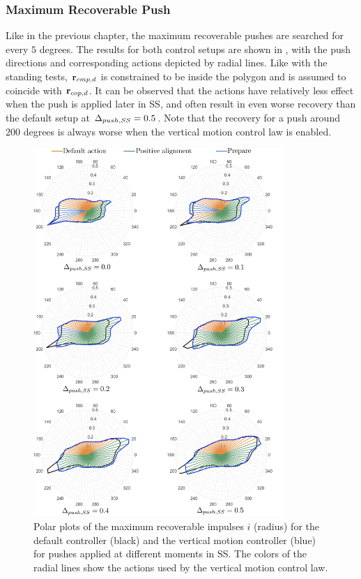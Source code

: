 \subsubsection{Maximum Recoverable Push}
Like in the previous chapter,  the maximum recoverable pushes are searched for every $5$ degrees. The results for both control setups are shown in , with the push directions and corresponding actions depicted by radial lines. Like with the standing tests, $\mathbf{r}_{cmp,d}$ is constrained to be inside the polygon and is assumed to coincide with $\mathbf{r}_{cop,d}$. It can be observed that the actions have relatively less effect when the push is applied later in \ac{SS}, and often result in even worse recovery than the default setup at $\Delta_{push,SS}=0.5$. Note that the recovery for a push around $200$ degrees is always worse when the vertical motion control law is enabled.
\begin{figure}
     \centering
        \includegraphics[width=0.85\textwidth]{STYLESTUFF/rounActions.png}
    \caption{Polar plots of the maximum recoverable impulses $i$ (radius) for the default controller (black) and the vertical motion controller (blue) for pushes applied at different moments in \ac{SS}. The colors of the radial lines show the actions used by the vertical motion control law.}
    \label{fig:roundPushActions}
\end{figure}
